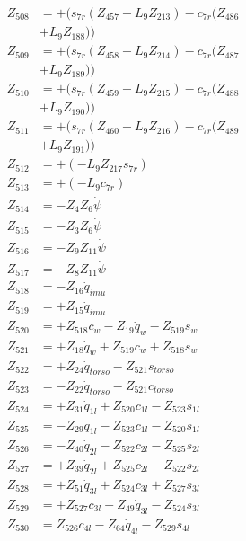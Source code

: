 \begin{multicols}{2}
\begin{align}
Z_{508} &= + (s_{7r}(Z_{457} - L_9Z_{213}) - c_{7r}(Z_{486}  \nonumber \\
&+ L_9Z_{188})) \nonumber \\
Z_{509} &= + (s_{7r}(Z_{458} - L_9Z_{214}) - c_{7r}(Z_{487}  \nonumber \\
&+ L_9Z_{189})) \nonumber \\
Z_{510} &= + (s_{7r}(Z_{459} - L_9Z_{215}) - c_{7r}(Z_{488}  \nonumber \\
&+ L_9Z_{190})) \nonumber \\
Z_{511} &= + (s_{7r}(Z_{460} - L_9Z_{216}) - c_{7r}(Z_{489}  \nonumber \\
&+ L_9Z_{191})) \nonumber \\
Z_{512} &= + (-L_9Z_{217}s_{7r}) \nonumber \\
Z_{513} &= + (-L_9c_{7r}) \nonumber \\
Z_{514} &=  - Z_{4}Z_{6}\dot{\psi} \nonumber \\
Z_{515} &=  - Z_{3}Z_{6}\dot{\psi} \nonumber \\
Z_{516} &= - Z_{9}Z_{11}\dot{\psi} \nonumber \\
Z_{517} &= - Z_{8}Z_{11}\dot{\psi} \nonumber \\
Z_{518} &= - Z_{16}\dot{q}_{imu} \nonumber \\
Z_{519} &= + Z_{15}\dot{q}_{imu} \nonumber \\
Z_{520} &= + Z_{518}c_{w} - Z_{19}\dot{q}_{w} - Z_{519}s_{w} \nonumber \\
Z_{521} &= + Z_{18}\dot{q}_{w} + Z_{519}c_{w} + Z_{518}s_{w} \nonumber \\
Z_{522} &= + Z_{24}\dot{q}_{torso} - Z_{521}s_{torso} \nonumber \\
Z_{523} &= - Z_{22}\dot{q}_{torso} - Z_{521}c_{torso} \nonumber \\
Z_{524} &= + Z_{31}\dot{q}_{1l} + Z_{520}c_{1l} - Z_{523}s_{1l} \nonumber \\
Z_{525} &= - Z_{29}\dot{q}_{1l} - Z_{523}c_{1l} - Z_{520}s_{1l} \nonumber \\
Z_{526} &= - Z_{40}\dot{q}_{2l} - Z_{522}c_{2l} - Z_{525}s_{2l} \nonumber \\
Z_{527} &= + Z_{39}\dot{q}_{2l} + Z_{525}c_{2l} - Z_{522}s_{2l} \nonumber \\
Z_{528} &= + Z_{51}\dot{q}_{3l} + Z_{524}c_{3l} + Z_{527}s_{3l} \nonumber \\
Z_{529} &= + Z_{527}c_{3l} - Z_{49}\dot{q}_{3l} - Z_{524}s_{3l} \nonumber \\
Z_{530} &=  Z_{526}c_{4l} - Z_{64}\dot{q}_{4l} - Z_{529}s_{4l} \nonumber \\

\end{align}
\end{multicols}
